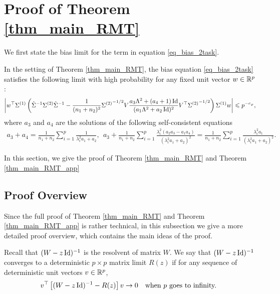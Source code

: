 \section{Proof of Theorem \ref{thm_main_RMT}}\label{appendix RMT}
We first state the bias limit for the term in equation \eqref{eq_bias_2task}.

\begin{theorem}\label{thm_main_RMT_app}
	In the setting of Theorem \ref{thm_main_RMT}, the bias equation \eqref{eq_bias_2task} satisfies the following limit with high probability for any fixed unit vector $w\in\mathbb{R}^p$:
			\begin{align}\label{lem_cov_derv_eq}
				{\left| {w^{\top} \Sigma^{(1)} \left({\hat{\Sigma}^{-1} \Sigma^{(2)} \hat{\Sigma}^{-1} - \frac{1}{(n_1+n_2)^2}{\Sigma^{(2)}}^{-1/2} V {\frac{a_3 \Lambda^2 + (a_4 + 1)\operatorname{Id}}{(a_1 \Lambda^2 + a_2\operatorname{Id})^2}} V^{\top} {\Sigma^{(2)}}^{-1/2}}\right) \Sigma^{(1)} w} \right|} \leqslant  p^{-c_{\varphi}},
			\end{align}
				where $a_{3}$ and $a_4$ are the solutions of the following self-consistent equations %
			\begin{align}\label{eq_a34extra}
				a_3 + a_4 = \frac{1}{n_1 + n_2}\sum_{i=1}^p \frac{1}{\lambda_i^2 a_1 + a_2}, \ \
				a_3 + \frac{1}{n_1 + n_2} \sum_{i=1}^p \frac{\lambda_i^2 (a_2 a_3-a_1 a_4 )}{(\lambda_i^2 a_1 + a_2)^2} = \frac{1}{n_1 + n_2} \sum_{i=1}^p \frac{\lambda_i^2 a_1}{(\lambda_i^2 a_1 + a_2)^{2}}.
			\end{align}
\end{theorem}
In this section, we give the proof of Theorem \ref{thm_main_RMT} and Theorem \ref{thm_main_RMT_app}

\subsection{Proof Overview}
Since the full proof of Theorem \ref{thm_main_RMT} and Theorem \ref{thm_main_RMT_app} is rather technical, in this subsection we give a more detailed proof overview, which contains the main ideas of the proof. 

Recall that $(W-z\operatorname{Id})^{-1}$ is the resolvent of matrix $W$. 
We say that $(W-z\operatorname{Id})^{-1}$ converges to a deterministic $p\times p$ matrix limit $R(z)$ if for any sequence of deterministic unit vectors $v\in \mathbb{R}^p$,
$$v^\top \left[(W-z\id)^{-1}-R(z)\right]v\to 0\ \ \ \text{when $p$ goes to infinity.
}$$

